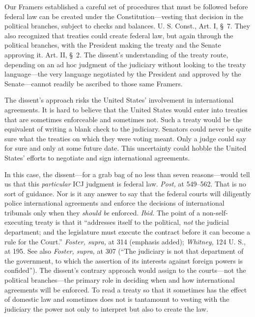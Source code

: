   Our Framers established a careful set of procedures that
must be followed before federal law can be created under the
Constitution---vesting that decision in the political branches, subject
to checks and balances. U. S. Const., Art. I, \S~7. They also
recognized that treaties could create federal law, but again through the
political branches, with the President making the treaty and the Senate
approving it. Art. II, \S~2. The dissent's understanding of the
treaty route, depending on an ad hoc judgment of the judiciary without
looking to the treaty language---the very language negotiated by the
President and approved by the Senate---cannot readily be ascribed to
those same Framers.

  The dissent's approach risks the United States' involvement in
international agreements. It is hard to believe that the United States
would enter into treaties that are sometimes enforceable and sometimes
not. Such a treaty would be the equivalent of writing a blank check to
the judiciary. Senators could never be quite sure what the treaties on
which they were voting meant. Only a judge could say for sure and only
at some future date. This uncertainty could \newpage  hobble the United
States' efforts to negotiate and sign international agreements.

  In this case, the dissent---for a grab bag of no less than seven
reasons---would tell us that this \emph{particular} ICJ judgment is federal
law. \emph{Post,} at 549--562. That is no sort of guidance. Nor is
it any answer to say that the federal courts will diligently police
international agreements and enforce the decisions of international
tribunals only when they \emph{should be} enforced. \emph{Ibid.} The
point of a non-self-executing treaty is that it ``addresses itself to
the political, \emph{not} the judicial department; and the legislature
must execute the contract before it can become a rule for the Court.''
\emph{Foster, supra,} at 314 (emphasis added); \emph{Whitney,} 124 U. S., at
195. See also \emph{Foster, supra,} at 307 (``The judiciary is not that
department of the government, to which the assertion of its interests
against foreign powers is confided''). The dissent's contrary
approach would assign to the courts---not the political branches---the
primary role in deciding when and how international agreements will
be enforced. To read a treaty so that it sometimes has the effect of
domestic law and sometimes does not is tantamount to vesting with the
judiciary the power not only to interpret but also to create the law.

